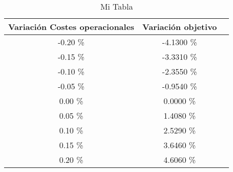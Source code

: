 \begin{table}
\centering
\begin{tabular}{|c|c|c|}
\hline
 Variación Costes operacionales & Variación objetivo \\ \hline
-0.20 \% & -4.1300 \% \\ \hline
-0.15 \% & -3.3310 \% \\ \hline
-0.10 \% & -2.3550 \% \\ \hline
-0.05 \% & -0.9540 \% \\ \hline
0.00 \% & 0.0000 \% \\ \hline
0.05 \% & 1.4080 \% \\ \hline
0.10 \% & 2.5290 \% \\ \hline
0.15 \% & 3.6460 \% \\ \hline
0.20 \% & 4.6060 \% \\ \hline
\end{tabular}
\caption{Mi Tabla}
\end{table}
